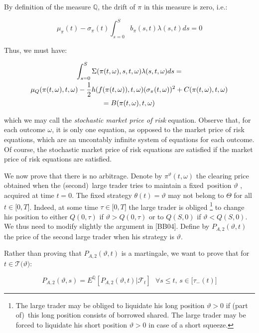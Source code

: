 \documentclass{article}
\begin{document}
By definition of the measure $\mathbb{Q}$, the drift of $\pi $ in this
measure is zero, i.e.:

\begin{equation*}
\mu _{\pi }(t)-\sigma _{\pi }(t)\int_{s=0}^{S}b_{\pi }(s,t)\lambda (s,t)ds=0
\end{equation*}

Thus, we must have:

\begin{gather}
\int_{s=0}^{S}\Sigma (\pi (t,\omega ),s,t,\omega )\lambda (s,t,\omega )ds=
\label{mpr_stoch} \\
\mu _{Q}(\pi (t,\omega ),t,\omega )-\frac{1}{2}h(f(\pi (t,\omega )),t,\omega
)(\sigma _{\pi }(t,\omega ))^{2}+C(\pi (t,\omega ),t,\omega )  \notag \\
=B(\pi (t,\omega ),t,\omega )
\end{gather}

which we may call the \textit{stochastic market price of risk} equation.
Observe that, for each outcome $\omega $, it is only one equation, as
opposed to the market price of risk equations, which are an uncontably
infinite system of equations for each outcome. Of course, the stochastic
market price of risk equations are satisfied if the market price of risk
equations are satisfied.

We now prove that there is no arbitrage. Denote by $\pi ^{\vartheta
}(t,\omega )$ the clearing price obtained when the (second)\ large trader
tries to maintain a fixed\ position $\vartheta $ , acquired at time $t=0$.
The fixed strategy $\theta (t)=\vartheta $ may not belong to $\Theta $ for
all $t\in \lbrack 0,T]$. Indeed, at some time $\tau \in \lbrack 0,T]$ the
large trader is obliged \footnote{%
The large trader may be obliged to liquidate his long position $\vartheta >0$
if (part of)\ this long position consists of borrowed shared. The large
trader may be forced to liquidate his short position $\vartheta >0$ in case
of a short squeeze.} to change his position to either $Q(0,\tau )$ if $%
\vartheta >Q(0,\tau )$ or to $Q(S,0)$ if $\vartheta <Q(S,0)$. We thus need
to modify slightly the argument in [BB04]. Define by $P_{A,2}(\vartheta ,t)$
the price of the second large trader when his strategy is $\vartheta $.

Rather than proving that $P_{A,2}(\vartheta ,t)$ is a martingale, we want to
prove that for $t\in \mathcal{T(}\vartheta )$:

\begin{equation*}
P_{A,2}(\vartheta ,s)=E^{\mathbb{Q}}[P_{A,2}(\vartheta ,t)|\mathcal{F}_{t}]%
\text{ \ \ }\forall s\leq t\text{, }s\in \lbrack \tau _{-}(t)]
\end{equation*}
\end{document}
